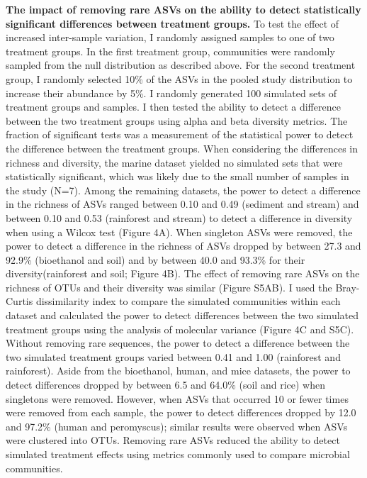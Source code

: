 \documentclass[
]{article}
\begin{document}
\textbf{The impact of removing rare ASVs on the ability to detect
statistically significant differences between treatment groups.} To test
the effect of increased inter-sample variation, I randomly assigned
samples to one of two treatment groups. In the first treatment group,
communities were randomly sampled from the null distribution as
described above. For the second treatment group, I randomly selected
10\% of the ASVs in the pooled study distribution to increase their
abundance by 5\%. I randomly generated 100 simulated sets of treatment
groups and samples. I then tested the ability to detect a difference
between the two treatment groups using alpha and beta diversity metrics.
The fraction of significant tests was a measurement of the statistical
power to detect the difference between the treatment groups. When
considering the differences in richness and diversity, the marine
dataset yielded no simulated sets that were statistically significant,
which was likely due to the small number of samples in the study (N=7).
Among the remaining datasets, the power to detect a difference in the
richness of ASVs ranged between 0.10 and 0.49 (sediment and stream) and
between 0.10 and 0.53 (rainforest and stream) to detect a difference in
diversity when using a Wilcox test (Figure 4A). When singleton ASVs were
removed, the power to detect a difference in the richness of ASVs
dropped by between 27.3 and 92.9\% (bioethanol and soil) and by between
40.0 and 93.3\% for their diversity(rainforest and soil; Figure 4B). The
effect of removing rare ASVs on the richness of OTUs and their diversity
was similar (Figure S5AB). I used the Bray-Curtis dissimilarity index to
compare the simulated communities within each dataset and calculated the
power to detect differences between the two simulated treatment groups
using the analysis of molecular variance (Figure 4C and S5C). Without
removing rare sequences, the power to detect a difference between the
two simulated treatment groups varied between 0.41 and 1.00 (rainforest
and rainforest). Aside from the bioethanol, human, and mice datasets,
the power to detect differences dropped by between 6.5 and 64.0\% (soil
and rice) when singletons were removed. However, when ASVs that occurred
10 or fewer times were removed from each sample, the power to detect
differences dropped by 12.0 and 97.2\% (human and peromyscus); similar
results were observed when ASVs were clustered into OTUs. Removing rare
ASVs reduced the ability to detect simulated treatment effects using
metrics commonly used to compare microbial communities.
\end{document}
